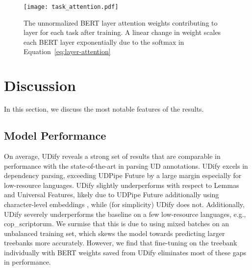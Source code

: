 \documentclass[11pt,a4paper]{article}
\begin{document}
\begin{figure}[tbp]
    \centering
    \texttt{[image: task\_attention.pdf]}
    \caption{\label{fig:bert-layer-weights}
        The unnormalized BERT layer attention weights  contributing to layer  for each task after training.
        A linear change in weight scales each BERT layer exponentially due to the softmax in Equation~\ref{eq:layer-attention}
    }
\end{figure}

\section{Discussion}

In this section, we discuss the most notable features of the results.

\subsection{Model Performance}

On average, UDify reveals a strong set of results that are comparable in performance with the state-of-the-art in parsing UD annotations.
UDify excels in dependency parsing, exceeding UDPipe Future by a large margin especially for low-resource languages.
UDify slightly underperforms with respect to Lemmas and Universal Features, likely due to UDPipe Future additionally using character-level embeddings \cite{santos2014learning, ling2015finding, ballesteros2015improved, kim2016character}, while (for simplicity) UDify does not.
Additionally, UDify severely underperforms the baseline on a few low-resource languages, e.g., cop\_scriptorum.
We surmise that this is due to using mixed batches on an unbalanced training set, which skews the model towards predicting larger treebanks more accurately.
However, we find that fine-tuning on the treebank individually with BERT weights saved from UDify eliminates most of these gaps in performance.
\end{document}
